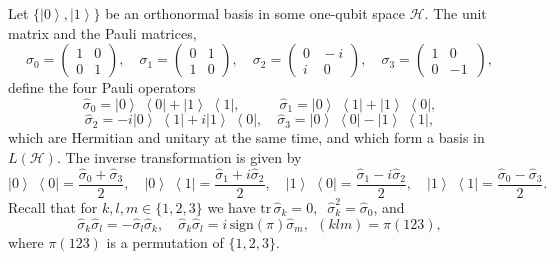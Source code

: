 \documentclass[12pt,a4paper,twoside]{article}      %
\newcommand{\ket}[1] {{\ensuremath{\left|#1\right\rangle}}}
\newcommand{\ketbra}[2]{{\ensuremath {\left|#1\right\rangle\!\;\!\!\left\langle#2\right|}}}
\begin{document}
Let $\{\ket{0},\ket{1}\}$ be an orthonormal basis in some one-qubit space $\mathcal{H}$. The unit matrix and the Pauli matrices,
\begin{equation}\label{}
\sigma_0=\left(\!
\begin{array}{cc}
 1 & 0 \\[2pt] 0 & 1
\end{array}\!\right), \quad
\sigma_1=\left(\!
\begin{array}{cc}
 0 & 1 \\[2pt] 1 & 0
\end{array}\!\right), \quad
\sigma_2=\left(\!\!
\begin{array}{cc}
 0 & \!-i \\[2pt] i\, & \,0
\end{array}\!\right), \quad
\sigma_3=\left(\!
\begin{array}{cc}
 1 & 0 \\[2pt] 0 & -1\,
\end{array}\!\!\right),
\nonumber
\end{equation}
define the four Pauli operators
\begin{equation}\label{}
\hat{\sigma}_{0}=\ketbra{0}{0}+\ketbra{1}{1},
\qquad\;\;\:
\hat{\sigma}_{1}=\ketbra{0}{1}+\ketbra{1}{0},
\nonumber
\end{equation}
\begin{equation}\label{}
\hat{\sigma}_{2}=-i\ketbra{0}{1}+i\ketbra{1}{0},\quad \hat{\sigma}_{3}=\ketbra{0}{0}-\ketbra{1}{1},
\nonumber
\end{equation}
which are Hermitian and unitary at the same time, and which form a basis in $L(\mathcal{H})$. The inverse transformation is given by
\begin{equation}\label{}
\ketbra00=\frac{\hat{\sigma}_0+ \hat{\sigma}_3}{2}, \quad
\ketbra01=\frac{\hat{\sigma}_1+ i\hat{\sigma}_2}{2}, \quad
\ketbra10=\frac{\hat{\sigma}_1- i\hat{\sigma}_2}{2}, \quad
\ketbra11=\frac{\hat{\sigma}_0- \hat{\sigma}_3}{2}.
\nonumber
\end{equation}
Recall that for $k,l,m\in\{1,2,3\}$\; we have\; $\mathrm{tr}\,\hat{\sigma}_{k}= 0,\;\;
\hat{\sigma}_{k}^2= \hat{\sigma}_{0}$,\; and
\begin{equation}\label{sigma} \hat{\sigma}_{k}\hat{\sigma}_{l}= - \hat{\sigma}_{l}\hat{\sigma}_{k}, \quad \hat{\sigma}_{k }\hat{\sigma}_{l}= i\,\mathrm{sign}(\pi)\hat{\sigma}_{m},\;\, (klm)=\pi(123),
\end{equation}
where $\pi(123)$ is a permutation of $\{1,2,3\}$.
\end{document}
